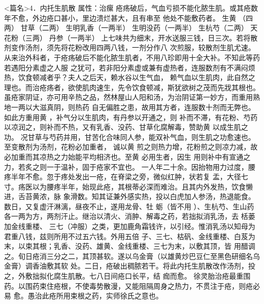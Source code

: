 \documentclass[a4paper,12pt,UTF8,twoside]{ctexbook}
\begin{document}
<篇名>4．内托生肌散
属性：治瘰 疮疡破后，气血亏损不能化脓生肌。或其疮数年不愈，外边疮口甚小，里边溃烂甚大，且有串至 
他处不能敷药者。 
生黄 （四两） 甘草（二两） 生明乳香（一两半） 生明没药（一两半） 生杭芍（二两） 
天花粉（三两） 丹参（一两半） 
上七味共为细末，开水送服三钱，日三次。若将散剂变作汤剂，须先将花粉改用四两八钱，一剂分作八 
次煎服，较散剂生肌尤速。 
从来治外科者，于疮疡破后不能化脓生肌者，不用八珍即用十全大补。不知此等药若遇阳分素虚之人服 
之犹可，若非阳分素虚或兼有虚热者，连服数剂有不满闷烦热，饮食顿减者乎？夫人之后天，赖水谷以生气血， 
赖气血以生肌肉，此自然之理也。而治疮疡者，欲使肌肉速生，先令饮食顿减，斯犹欲树之茂而先戕其根也。 
虽疮家阴证，亦可用辛热之品，然林屋山人阳和汤，为治阴证第一妙方，而重用熟地一两以大滋真阴，则热药 
自无偏胜之患，故用其方者，连服数十剂而无弊也。如此方重用黄 ，补气分以生肌肉，有丹参以开通之，则 
补而不滞，有花粉、芍药以凉润之，则补而不热，又有乳香、没药、甘草化腐解毒，赞助黄 以成生肌之功。 
况甘草与芍药并用，甘苦化合味同人参，能双补气血，则生肌之功愈速也。至变散剂为汤剂，花粉必加重者， 
诚以黄 煎之则热力增，花粉煎之则凉力减，故必加重而其凉热之力始能平均相济也。至黄 必用生者，因生 
用则补中有宣通之力，若炙之则一于温补，固于疮家不宜也。 
一人年二十余。因抬物用力过度，腰疼半年不愈。忽于疼处发出一疮，在脊梁之旁，微似红肿，状若复 
盂，大径七寸。疡医以为腰疼半年，始现此疮，其根蒂必深而难治。且其内外发热，饮食懒进，舌苔黄浓，脉 
象滑数。知其证兼外感实热，投以白虎加人参汤，热退能食。数日，又复虚汗淋漓，昼夜不止，遂用龙骨、牡 
蛎（皆不用 ）、生杭芍、生山药各一两为方，两剂汗止。继治以清火、消肿、解毒之药，若拙拟消乳汤，去 
栝蒌加金线重楼、 
三七（冲服）之类，更加鹿角霜钱许，以引经。惟消乳汤以知母为君重八钱，兹则所用不过五六钱。外用五倍 
子、三七、枯矾、金线重楼、白芨为末，以束其根；乳香、没药、雄黄、金线重楼、三七为末，以敷其顶，皆 
用醋调之。旬日疮消三分之二，其顶甚软。遂以乌金膏（以雄黄炒巴豆仁至黑色研细名乌金膏）调香油敷其软 
处。二日，疮破出稠脓若干。将此内托生肌散改作汤剂，投之，外敷拙拟化腐生肌散。七八日间疮口长平，结 
痂而愈。 
徐灵胎治疮最重围药。以围药束住疮根，不使毒势散漫，又能阻隔周身之热力，不贯注于疮，则疮必易 
愈。愚治此疮所用束根之药，实师徐氏之意也。 
\end{document}
